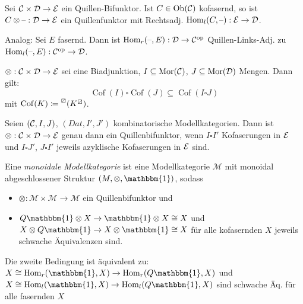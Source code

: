 \documentclass{cheat-sheet}
\newcommand{\lhhe}{\boxslash} %
\newcommand{\ModC}{\mathcal{M}} %
\DeclareMathOperator{\Coff}{Cof} %
\newcommand{\UnitOb}{\mathbbm{1}} %
\begin{document}
\begin{prop}
  Sei $\mathcal{C} \times \mathcal{D} \to \mathcal{E}$ ein Quillen-Bifunktor.
  Ist $C \in \operatorname{Ob}(\mathcal{C})$ kofasernd, so ist $C \otimes \text{--} : \mathcal{D} \to \mathcal{E}$ ein Quillenfunktor mit Rechtsadj. $\operatorname{Hom}_l(C, \text{--}) : \mathcal{E} \to \mathcal{D}$.
\end{prop}

\begin{bem}
  Analog: Sei $E$ fasernd.
  Dann ist $\operatorname{Hom}_r(\text{--}, E) : \mathcal{D} \to \mathcal{C}^{\mathrm{op}}$ Quillen-Links-Adj. zu $\operatorname{Hom}_l(\text{--}, E) : \mathcal{C}^{\mathrm{op}} \to \mathcal{D}$.
\end{bem}

\begin{lem}
  $\otimes : \mathcal{C} \times \mathcal{D} \to \mathcal{E}$ sei eine Biadjunktion, $I \subseteq \operatorname{Mor}(\mathcal{C})$, $J \subseteq \operatorname{Mor}(\mathcal{D})$ Mengen. Dann gilt:
  \[ \Coff(I) \square \Coff(J) \subseteq \Coff(I \square J) \]
  mit $\Coff(K) \coloneqq \prescript{\lhhe}{} (K^\lhhe)$.
\end{lem}

\begin{satz}
  Seien $(\mathcal{C}, I, J)$, $(Dat, I', J')$ kombinatorische Modellkategorien.
  Dann ist $\otimes : \mathcal{C} \times \mathcal{D} \to \mathcal{E}$ genau dann ein Quillenbifunktor, wenn $I \square I'$ Kofaserungen in $\mathcal{E}$ und $I \square J'$, $J \square I'$ jeweils azyklische Kofaserungen in $\mathcal{E}$ sind.
\end{satz}

\begin{defn}
  Eine \emph{monoidale Modellkategorie} ist eine Modellkategorie $\ModC$ mit monoidal abgeschlossener Struktur $(M, \otimes, \UnitOb)$, sodass
  \begin{itemize}
    \item $\otimes : \ModC \times \ModC \to \ModC$ ein Quillenbifunktor und
    \item $Q \UnitOb \otimes X \to \UnitOb \otimes X \cong X$ und $X \otimes Q \UnitOb \to X \otimes \UnitOb \cong X$ für alle kofasernden $X$ jeweils schwache Äquivalenzen sind.
  \end{itemize}
\end{defn}

\begin{bem}
  Die zweite Bedingung ist äquivalent zu: $X \cong \Hom_r(\UnitOb, X) \to \Hom_r(Q \UnitOb, X)$ und $X \cong \Hom_l(\UnitOb, X) \to \Hom_l(Q \UnitOb, X)$ sind schwache Äq. für alle fasernden $X$
\end{bem}


\pagebreak

\end{document}
